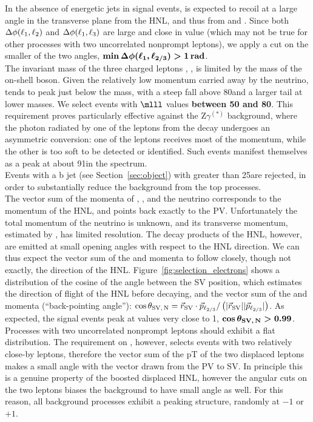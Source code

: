 In the absence of energetic jets in signal events, \lone is expected
to recoil at a large angle in the transverse plane from the HNL, and
thus from \ltwo and \lthree. Since both $\Delta\phi(\ell_1,\ell_2)$ and
$\Delta\phi(\ell_1,\ell_3)$ are large and close in value (which may not be
true for other processes with two uncorrelated nonprompt leptons), we
apply a cut on the smaller of the two angles,
$\boldsymbol{\min{\Delta\phi(\ensuremath{\ell_1},\ensuremath{\ell_{2/3}})}>1\,\mathrm{rad}}$. \\

The invariant mass of the three charged leptons \mlll, \mthreel, is limited
by the mass of the on-shell \PW boson. Given the relatively low
momentum carried away by the neutrino, \mlll tends to peak just
below the \PW mass, with a steep fall above 80\GeV and a larger tail
at lower masses. We select
events with $\boldsymbol{\mlll}$ values \textbf{between 50 and 80\GeV}. This requirement
proves particularly effective against the Z$\gamma^{(\ast)}$ background, where the
photon radiated by one of the leptons from the \PZ decay undergoes an
asymmetric conversion: one of the leptons receives most of the \PGg
momentum, while the other is too soft to be detected or
identified. Such events manifest themselves as a peak at about 91\GeV in the \mthreel
spectrum. \\

Events with a b jet (see Section~\ref{sec:object}) with \pt greater
than 25\GeV are rejected, in order to substantially reduce the
background from the top processes.\\

The vector sum of the momenta of \ltwo, \lthree, and the neutrino
corresponds to the momentum of the HNL, and points back exactly to the
PV. Unfortunately the total momentum of the neutrino is unknown, and
its transverse momentum, estimated by \ptmiss, has limited resolution.
The decay products of the HNL, however, are emitted at small opening
angles with respect to the HNL direction. We can thus expect the
vector sum of the \ltwo and \lthree momenta to follow closely, though
not exactly, the direction of the
HNL. Figure~\ref{fig:selection_electrons} shows a distribution of the cosine of the angle between the SV
position, which estimates the direction of flight of the HNL before
decaying, and the vector sum of the \ltwo and \lthree momenta
(``back-pointing angle''):
$\cos{\theta_{\mathrm{SV,\,\ensuremath{\mathrm{N}}}}} = \vec{r}_{\mathrm{SV}}\cdot\vec{p}_{\mathrm{\ell_{2/3}}}/
\left(|\vec{r}_{\mathrm{SV}}||\vec{p}_{\mathrm{\ell_{2/3}}}|\right)$.
As expected, the signal events peak at values very close to 1,
$\boldsymbol{\cos{\theta_{\mathrm{SV,\,\ensuremath{\mathrm{N}}}}} > 0.99}$.
Processes with two uncorrelated nonprompt leptons should exhibit a
flat \costheta distribution. The requirement on \DRtwol, however,
selects events with two relatively close-by leptons, therefore the
vector sum of the pT of the two displaced leptons makes a small angle
with the vector drawn from the PV to SV. In principle this is a
genuine property of the boosted displaced HNL, however the angular
cuts on the two leptons biases the background to have small angle as
well. For this reason, all
background processes exhibit a peaking structure, randomly at $-1$ or
$+1$.\\

